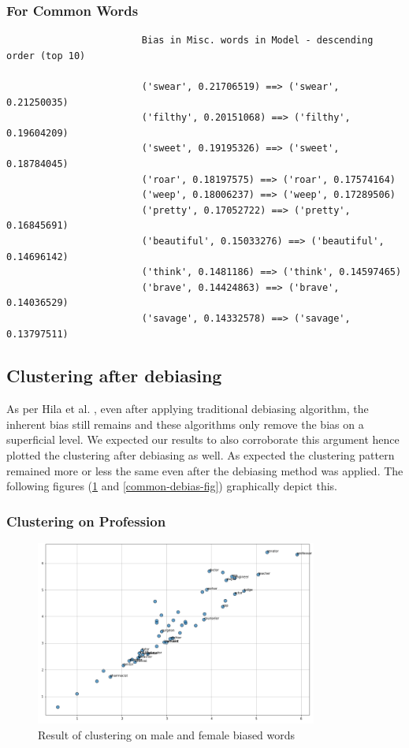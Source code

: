 \documentclass[12pt, a4paper]{article}
\begin{document}
				\subsubsection{For Common Words}
					\begin{verbatim}
						Bias in Misc. words in Model - descending order (top 10)
						
						('swear', 0.21706519) ==> ('swear', 0.21250035)
						('filthy', 0.20151068) ==> ('filthy', 0.19604209)
						('sweet', 0.19195326) ==> ('sweet', 0.18784045)
						('roar', 0.18197575) ==> ('roar', 0.17574164)
						('weep', 0.18006237) ==> ('weep', 0.17289506)
						('pretty', 0.17052722) ==> ('pretty', 0.16845691)
						('beautiful', 0.15033276) ==> ('beautiful', 0.14696142)
						('think', 0.1481186) ==> ('think', 0.14597465)
						('brave', 0.14424863) ==> ('brave', 0.14036529)
						('savage', 0.14332578) ==> ('savage', 0.13797511)
					\end{verbatim}
					
		\subsection{Clustering after debiasing}
			As per Hila et al. \cite{1}, even after applying traditional debiasing algorithm, the inherent bias still remains and these algorithms only remove the bias on a superficial level. We expected our results to also corroborate this argument hence plotted the clustering after debiasing as well. As expected the clustering pattern remained more or less the same even after the debiasing method was applied. The following figures (\ref{profession-debias-fig} and \ref{common-debias-fig}) graphically depict this.
			
				\subsubsection{Clustering on Profession}
				\begin{figure}[H]
					\centerline{\includegraphics[width=25em]{debiased_profession.png}}
					\caption{Result of clustering on male and female biased words}
					\label{profession-debias-fig}
				\end{figure}
				
\end{document}
